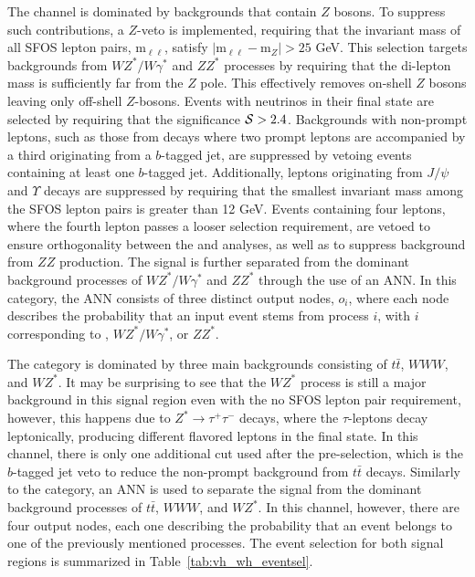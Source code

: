 The \zdom{} channel is dominated by backgrounds that contain $Z$ bosons. To suppress such contributions, a $Z$-veto is implemented, requiring that the invariant mass of all SFOS lepton pairs, $\mathrm{m}_{\ell\ell}$, satisfy $|\mathrm{m}_{\ell\ell} - \mathrm{m}_{Z}| > 25$ GeV. This selection targets backgrounds from $WZ^{*}/W\gamma^{*}$ and $ZZ^{*}$ processes by requiring that the di-lepton mass is sufficiently far from the $Z$ pole. This effectively removes on-shell $Z$ bosons leaving only off-shell $Z$-bosons. Events with neutrinos in their final state are selected by requiring that the \met{} significance $\mathcal{S} > 2.4$. Backgrounds with non-prompt leptons, such as those from \ttbar{} decays where two prompt leptons are accompanied by a third originating from a $b$-tagged jet, are suppressed by vetoing events containing at least one $b$-tagged jet. Additionally, leptons originating from $J/\psi$ and $\Upsilon$ decays are suppressed by requiring that the smallest invariant mass among the SFOS lepton pairs is greater than 12 GeV. Events containing four leptons, where the fourth lepton passes a looser selection requirement, are vetoed to ensure orthogonality between the \wh{} and \zh{} analyses, as well as to suppress background from $ZZ$ production. The \wh{} signal is further separated from the dominant background processes of $WZ^{*}/W\gamma^{*}$ and $ZZ^{*}$ through the use of an ANN\@. In this category, the ANN consists of three distinct output nodes, $o_{i}$, where each node describes the probability that an input event stems from process $i$, with $i$ corresponding to \wh{}, $WZ^{*}/W\gamma^{*}$, or $ZZ^{*}$.

The \zdep{} category is dominated by three main backgrounds consisting of $t\bar{t}$, $WWW$, and $WZ^{*}$. It may be surprising to see that the $WZ^{*}$ process is still a major background in this signal region even with the no SFOS lepton pair requirement, however, this happens due to $Z^{*} \to \tau^{+}\tau^{-}$ decays, where the $\tau$-leptons decay leptonically, producing different flavored leptons in the final state. In this channel, there is only one additional cut used after the pre-selection, which is the $b$-tagged jet veto to reduce the non-prompt background from $t\bar{t}$ decays. Similarly to the \zdom{} category, an ANN is used to separate the \wh{} signal from the dominant background processes of $t\bar{t}$, $WWW$, and $WZ^{*}$. In this channel, however, there are four output nodes, each one describing the probability that an event belongs to one of the previously mentioned processes. The event selection for both \wh{} signal regions is summarized in Table~\ref{tab:vh_wh_eventsel}.

